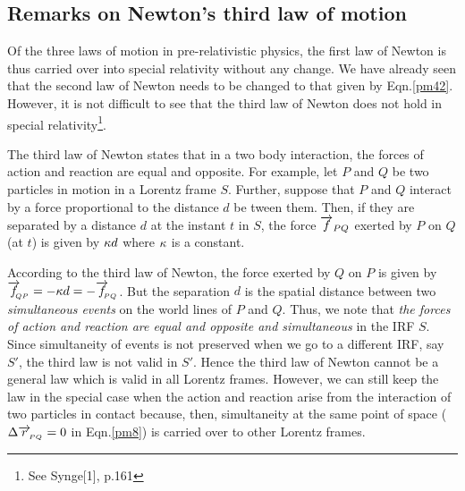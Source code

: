 \subsection{Remarks on Newton's  third law of 
motion}
Of the three laws of motion in pre-relativistic 
physics, 
the first law of Newton is thus carried over into 
special 
relativity without any change. We have already seen 
that  
the second law of Newton needs to be changed to that 
given 
by Eqn.\eqref{pm42}. However, it is not difficult to 
see 
that the third law of Newton does not hold in special 
relativity\footnote{See Synge[1], p.161}.

The third law of Newton states that in a two body 
interaction, the forces of action and reaction are 
equal and 
opposite. For example, let $P$ and $Q$ be two particles 
in 
motion in a Lorentz frame  $S$. Further, suppose that 
$P$ 
and $Q$ interact by a force proportional to the 
distance $d$ 
be tween them. Then, if they are separated by a 
distance $d$ 
at the instant $t$ in  $S$, the force $\overrightarrow{f}_{PQ}$ 
exerted 
by $P$ on $Q$ (at $t$) is given by ${\kappa} d$  where 
${\kappa}$ 
is a constant.
\begin{figure}[H]
\begin{center}
\end{center}
\caption{}\label{fig6.11}
\end{figure}

According to the third law of Newton, the force exerted 
by $Q$ on $P$  is given by $\overrightarrow{f}_{_{\hspace*{-1.5pt}{\negthinspace\negthinspace QP}}} = 
-{\kappa} d =-\overrightarrow{f}_{_{\hspace*{-1.5pt}{\negthinspace\negthinspace PQ}}}$.  But the separation  
$d$ is the spatial distance between two 
\textsl{simultaneous events} on the world lines of $P$ 
and $Q$. Thus, we note that \textsl{the forces of 
action and reaction are equal and opposite and 
simultaneous} in the IRF $S$. Since simultaneity of 
events is not preserved when we go to a different IRF, 
say $S'$, the third law is not valid in  $S'$. Hence  
the third law of Newton cannot be a general law which 
is valid in all Lorentz frames. However, we can still 
keep the law in the special case when the action and 
reaction arise from the interaction of two particles in 
contact because, then, simultaneity at the same point 
of space ($\Delta\overrightarrow{r}_{_{\hspace*{-1.5pt}{PQ}}}=0$ in 
Eqn.\eqref{pm8}) is carried over to other Lorentz 
frames.

